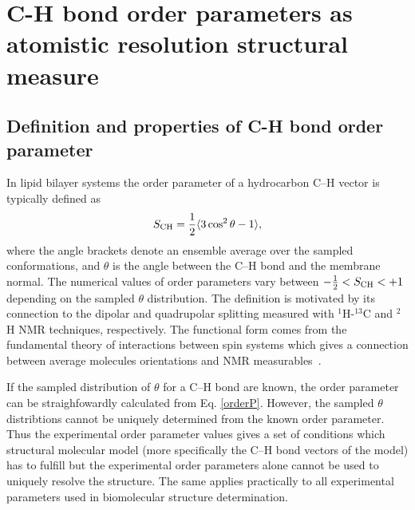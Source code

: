 \documentclass[aps,prl,superscriptaddress,twocolumn]{revtex4}
\begin{document}
\section{C-H bond order parameters as atomistic resolution structural measure}




\subsection{Definition and properties of C-H bond order parameter}\label{OPdefinition}
In lipid bilayer systems the order parameter of a hydrocarbon C--H vector is typically defined as 
\begin{equation}\label{orderP}
S_{{\rm CH}}=\frac{1}{2}\langle 3 \cos^2 \theta-1 \rangle,
\end{equation} 
where the angle brackets denote an ensemble average over the sampled conformations, and $\theta$ is the 
angle between the C--H bond and the membrane normal.
The numerical values of order parameters vary between $-\frac{1}{2} < S_{{\rm CH}} < +1$
depending on the sampled $\theta$ distribution.
The definition is motivated by its connection to the dipolar and quadrupolar splitting measured with
$^1$H-$^{13}$C and $^2$H NMR techniques, respectively. The functional form comes from 
the fundamental theory of interactions between spin systems which gives a connection between 
average molecules orientations and NMR measurables~\cite{abragam}. 

If the sampled distribution of $\theta$ for a C--H bond are known, the order parameter
can be straighfowardly calculated from Eq. \ref{orderP}. However, the sampled $\theta$ 
distribtions cannot be uniquely determined from the known order parameter. Thus the experimental
order parameter values gives a set of conditions which structural molecular model 
(more specifically the C--H bond vectors of the model) has to fulfill
but the experimental order parameters alone cannot be used to uniquely 
resolve the structure. The same applies practically to all
experimental parameters used in biomolecular structure determination. 
\end{document}

